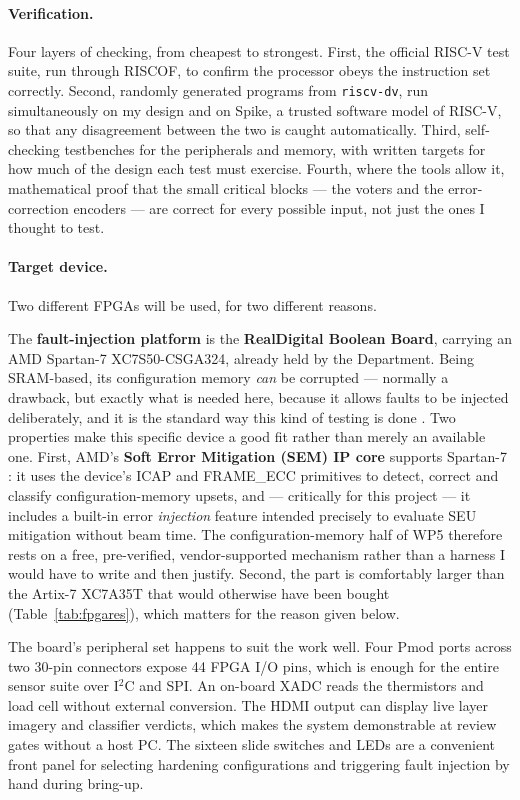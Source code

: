 \documentclass[11pt,a4paper]{article}
\begin{document}
\paragraph{Verification.}
Four layers of checking, from cheapest to strongest. First, the official RISC-V
test suite, run through RISCOF, to confirm the processor obeys the instruction set
correctly. Second, randomly generated programs from \texttt{riscv-dv}, run
simultaneously on my design and on Spike, a trusted software model of RISC-V, so
that any disagreement between the two is caught automatically. Third,
self-checking testbenches for the peripherals and memory, with written targets for
how much of the design each test must exercise. Fourth, where the tools allow it,
mathematical proof that the small critical blocks --- the voters and the
error-correction encoders --- are correct for every possible input, not just the
ones I thought to test.

\paragraph{Target device.}
Two different FPGAs will be used, for two different reasons.

The \textbf{fault-injection platform} is the \textbf{RealDigital Boolean Board},
carrying an AMD Spartan-7 XC7S50-CSGA324, already held by the Department. Being
SRAM-based, its
configuration memory \emph{can} be corrupted --- normally a drawback, but exactly
what is needed here, because it allows faults to be injected deliberately, and it
is the standard way this kind of testing is done
\cite{wilson2019neutron,noelv_proton}. Two properties make this specific device a
good fit rather than merely an available one. First, AMD's \textbf{Soft Error
Mitigation (SEM) IP core} supports Spartan-7 \cite{semip}: it uses the device's
ICAP and FRAME\_ECC primitives to detect, correct and classify configuration-memory
upsets, and --- critically for this project --- it includes a built-in error
\emph{injection} feature intended precisely to evaluate SEU mitigation without
beam time. The configuration-memory half of WP5 therefore rests on a free,
pre-verified, vendor-supported mechanism rather than a harness I would have to
write and then justify. Second, the part is comfortably larger than the Artix-7
XC7A35T that would otherwise have been bought
(Table~\ref{tab:fpgares}), which matters for the reason given below.

The board's peripheral set happens to suit the work well. Four Pmod ports across
two 30-pin connectors expose 44 FPGA I/O pins, which is enough for the entire
sensor suite over I\(^2\)C and SPI. An on-board XADC reads the thermistors and
load cell without external conversion. The HDMI output can display live layer
imagery and classifier verdicts, which makes the system demonstrable at review
gates without a host PC. The sixteen slide switches and LEDs are a convenient
front panel for selecting hardening configurations and triggering fault
injection by hand during bring-up.
\end{document}
